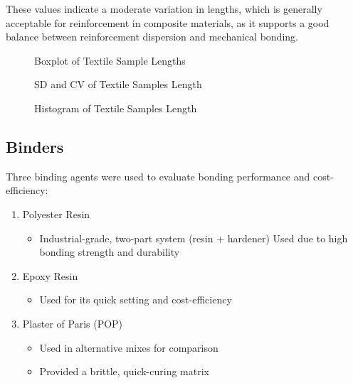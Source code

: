 \noindent These values indicate a moderate variation in lengths, which is generally acceptable for reinforcement in composite materials, as it supports a good balance between reinforcement dispersion and mechanical bonding.

\begin{figure}[H]
	\centering
	\begin{minipage}{0.45\textwidth}
		\centering
		\caption{Boxplot of Textile Sample Lengths}
	\end{minipage}
	\hfill
	\begin{minipage}{0.45\textwidth}
		\centering
		\caption{SD and CV of Textile Samples Length}
	\end{minipage}
\end{figure}

\begin{figure}[H]
	\centering
	\caption{Histogram of Textile Samples Length}
\end{figure}

\subsection{Binders}
Three binding agents were used to evaluate bonding performance and cost-efficiency:
\begin{enumerate}
	\item Polyester Resin
	      \begin{itemize}
		      \item Industrial-grade, two-part system (resin + hardener) Used due to high bonding strength and durability
	      \end{itemize}
	\item Epoxy Resin
	      \begin{itemize}
		      \item Used for its quick setting and cost-efficiency
	      \end{itemize}
	\item Plaster of Paris (POP)
	      \begin{itemize}
		      \item Used in alternative mixes for comparison
		      \item Provided a brittle, quick-curing matrix
	      \end{itemize}
\end{enumerate}

